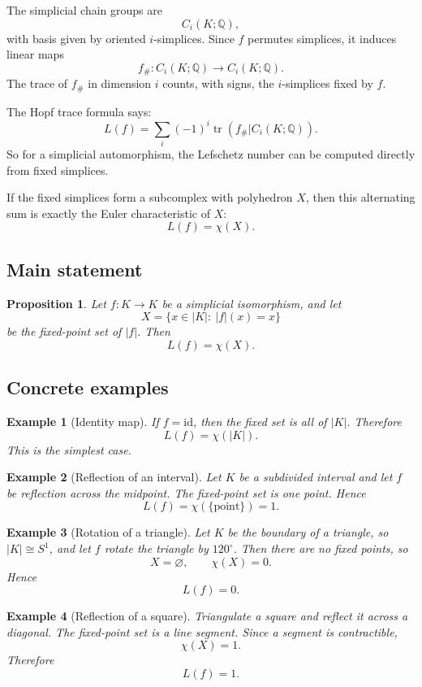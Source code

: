 \documentclass[12pt,a4paper]{article}
\newcommand{\Q}{\mathbb{Q}}
\newcommand{\Chi}{\chi}
\newtheorem{proposition}{Proposition}
\newtheorem{example}{Example}
\theoremstyle{notespace}
\begin{document}
	The simplicial chain groups are
	\[
	C_i(K;\Q),
	\]
	with basis given by oriented $i$-simplices. Since $f$ permutes simplices, it induces linear maps
	\[
	f_\#:C_i(K;\Q)\to C_i(K;\Q).
	\]
	The trace of $f_\#$ in dimension $i$ counts, with signs, the $i$-simplices fixed by $f$.
	
	The Hopf trace formula says:
	\[
	L(f)=\sum_i (-1)^i\operatorname{tr}(f_\#|C_i(K;\Q)).
	\]
	So for a simplicial automorphism, the Lefschetz number can be computed directly from fixed simplices.
	
	If the fixed simplices form a subcomplex with polyhedron $X$, then this alternating sum is exactly the Euler characteristic of $X$:
	\[
	L(f)=\Chi(X).
	\]
	
	\subsection{Main statement}
	
	\begin{proposition}
		Let $f:K\to K$ be a simplicial isomorphism, and let
		\[
		X=\{x\in |K|:\ |f|(x)=x\}
		\]
		be the fixed-point set of $|f|$. Then
		\[
		L(f)=\Chi(X).
		\]
	\end{proposition}
	
	\subsection{Concrete examples}
	
	\begin{example}[Identity map]
		If $f=\mathrm{id}$, then the fixed set is all of $|K|$. Therefore
		\[
		L(f)=\Chi(|K|).
		\]
		This is the simplest case.
	\end{example}
	
	\begin{example}[Reflection of an interval]
		Let $K$ be a subdivided interval and let $f$ be reflection across the midpoint. The fixed-point set is one point. Hence
		\[
		L(f)=\Chi(\{\text{point}\})=1.
		\]
	\end{example}
	
	\begin{example}[Rotation of a triangle]
		Let $K$ be the boundary of a triangle, so $|K|\cong S^1$, and let $f$ rotate the triangle by $120^\circ$. Then there are no fixed points, so
		\[
		X=\varnothing,\qquad \Chi(X)=0.
		\]
		Hence
		\[
		L(f)=0.
		\]
	\end{example}
	
	\begin{example}[Reflection of a square]
		Triangulate a square and reflect it across a diagonal. The fixed-point set is a line segment. Since a segment is contractible,
		\[
		\Chi(X)=1.
		\]
		Therefore
		\[
		L(f)=1.
		\]
	\end{example}
	
\end{document}
